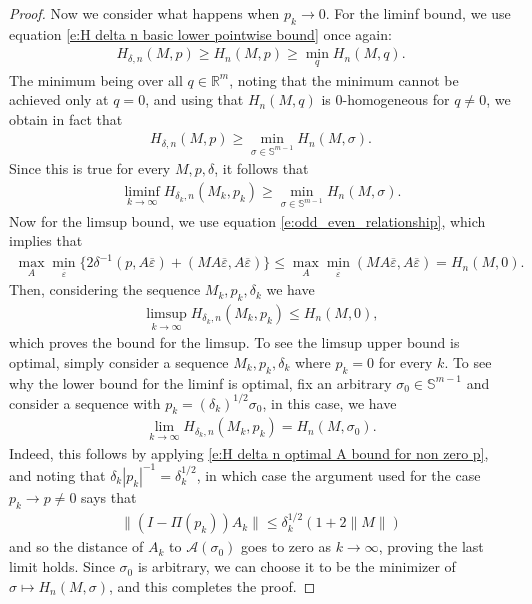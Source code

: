 \documentclass[reqno]{amsart}
\numberwithin{equation}{section}
\begin{document}
\begin{proof}
Now we consider what happens when $p_k \to 0$. For the liminf bound, we  use equation \eqref{e:H delta n basic lower pointwise bound} once again:
\begin{align*}
  H_{\delta,n}(M,p) \geq H_{n}(M,p) \geq \min_{q}H_{n}(M,q).
\end{align*}
The minimum being over all $q\in\mathbb{R}^m$, noting that the minimum cannot be achieved only at $q=0$, and using that $H_n(M,q)$ is $0$-homogeneous for $q\neq 0$, we obtain in fact that  
\begin{align*}
  H_{\delta,n}(M,p) \geq \min_{\sigma \in \mathbb{S}^{m-1}}H_{n}(M,\sigma).
\end{align*}
Since this is true for every $M,p,\delta$, it follows that
\begin{align*}
  \liminf_{k \to \infty} H_{\delta_k,n}(M_k,p_k) \geq \min_{\sigma \in \mathbb{S}^{m-1}}H_n(M,\sigma).    
\end{align*}
Now for the limsup bound, we use equation \eqref {e:odd_even_relationship}, which implies that
\begin{align*}
  \max_A \min_{\overline\varepsilon}\{2\delta^{-1}(p,A\overline \varepsilon)+ (MA\overline \varepsilon,A\overline \varepsilon)\} \leq \max_A \min_{\overline\varepsilon} (MA\overline \varepsilon,A\overline \varepsilon) = H_n(M,0).
\end{align*}
Then, considering the sequence $M_k,p_k,\delta_k$ we have
\begin{align*}
  \limsup_{k \to \infty} H_{\delta_k,n}(M_k,p_k) \leq H_n(M,0),
\end{align*}
which proves the bound for the limsup. To see the limsup upper bound is optimal, simply consider a sequence $M_k,p_k,\delta_k$ where $p_k = 0$ for every $k$. To see why the lower bound for the liminf is optimal, fix an arbitrary $\sigma_0 \in \mathbb{S}^{m-1}$ and consider a sequence with $p_k = (\delta_k)^{1/2}\sigma_0$, in this case, we have
\begin{align*}
  \lim_{k \to \infty} H_{\delta_k,n}(M_k,p_k) = H_n(M,\sigma_0).  
\end{align*}
Indeed, this follows by applying \eqref{e:H delta n optimal A bound for non zero p}, and noting that $\delta_k|p_k|^{-1} = \delta_k^{1/2}$, in which case the argument used for the case $p_k \to p \neq 0$ says that
\begin{align*}
  \|(I-\Pi(p_k))A_k\| \leq \delta_k^{1/2}(1+2\|M\|)    
\end{align*}
and so the distance of $A_k$ to $\mathcal{A}(\sigma_0)$ goes to zero as $k\to \infty$, proving the last limit holds. Since $\sigma_0$ is arbitrary, we can choose it to be the minimizer of $\sigma \mapsto H_n(M,\sigma)$, and this completes the proof.

\end{proof}
\end{document}

